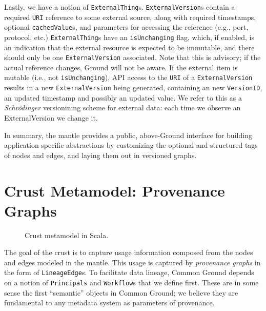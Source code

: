\documentclass{article}
\newcommand{\mantle}{mantle\xspace}
\newcommand{\crust}{crust\xspace}
\newcommand{\Crust}{Crust\xspace}
\newcommand{\uri}{\texttt{URI}\xspace}
\begin{document}
Lastly, we have a notion of \texttt{ExternalThing}s. \texttt {ExternalVersion}s 
contain a required \uri reference to some external source, along with required timestamps, 
optional \texttt{cachedValue}s, and parameters for accessing the
reference (e.g., port, protocol, etc.) \texttt{ExternalThing}s have an \texttt{isUnchanging}
flag, which, if enabled, is an indication that the external resource is expected to be
immutable, and there should only be one \texttt{ExternalVersion} associated.
Note that this is advisory; if the actual reference changes, Ground will not be aware. 
If the external item is mutable (i.e., not \texttt{isUnchanging}), API access to the \texttt{URI}
of a \texttt{ExternalVersion} results in a new \texttt{ExternalVersion} being generated, containing an new
\texttt{VersionID}, an updated timestamp and possibly an updated value. We refer to this as a \emph{Schr\"{o}dinger} versionining scheme for external data: each time we observe an ExternalVersion we change it.

In summary, the \mantle provides a public, above-Ground interface for building application-specific 
abstractions by customizing the optional and structured tags of nodes and edges, and laying them out in versioned graphs. 



\section{\Crust Metamodel: Provenance Graphs}

\begin{figure}[ht]
\begin{scriptsize}
\begin{multicols}{2}

\end{multicols}
\end{scriptsize}
\caption{\Crust metamodel in Scala.}
\label{fig:crust}
\end{figure}
The goal of the \crust is to capture usage information composed from the nodes and edges modeled in the mantle.  
This usage is captured by \emph{provenance graphs} in the form of
\texttt{LineageEdge}s.  To facilitate data lineage, Common Ground depends on
a notion of \texttt{Principals} and \texttt{Workflow}s that we define first.  These
are in some sense the first ``semantic'' objects in Common Ground; we believe they are fundamental
to any metadata system as parameters of provenance.
\end{document}
